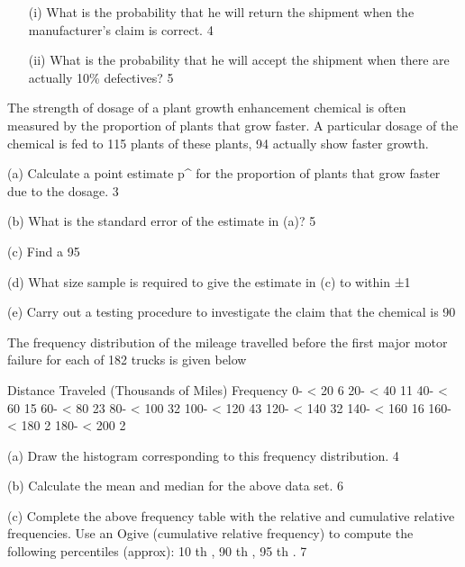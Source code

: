 \begin{itemize} 
\item[(i)] What is the probability that he will return the shipment when the  manufacturer's claim  is correct. 						4  

\item[(ii)] What is the probability that he will accept the shipment when there are actually 10\%  defectives? 							5 
\end{itemize}

The strength of dosage of a plant growth enhancement chemical is often measured by the proportion of plants that grow faster. A particular dosage of the chemical is fed to 115 plants of these plants, 94 actually show faster growth. 
                                                          
(a) Calculate a point estimate p^ for the proportion of plants that grow faster due to the  dosage. 									3 
 
(b) What is the standard error of the estimate in (a)? 			5 
 
(c) Find a 95%
 
(d) What size sample is required to give the estimate in (c) to within ±1%
 
(e) Carry out a testing procedure to investigate the claim that the chemical is 90%
 
The frequency distribution of the mileage travelled before the first major motor failure 
for each of 182 trucks is given below 
 
 

 
Distance Traveled 
(Thousands of Miles) 		Frequency 
0- < 20 			      6 
20- < 40 			      11 
40- < 60 			      15 
60- < 80 			      23 
80- < 100 			      32 
100- < 120 		     43 
120- < 140 	                 32 
140- < 160 	                 16 
160- < 180 	                  2 
180- < 200 	                  2 
 
(a) Draw the histogram corresponding to this frequency distribution. 	4 

(b) Calculate the mean and median for the above data set.			6 
 
(c) Complete the above frequency table with the relative and cumulative relative frequencies. Use an Ogive (cumulative relative frequency) to compute the following  percentiles  (approx): 10 th , 90 th , 95 th . 				7 
 
